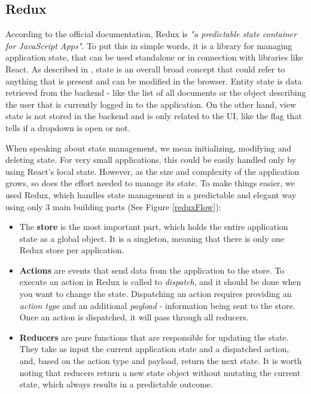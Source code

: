 \subsection{Redux}
\label{section:redux}

According to the official documentation, Redux is \textit{"a predictable state container for JavaScript Apps"}. To put this in simple words, it is a library for managing application state, that can be used standalone or in connection with libraries like React. As described in \cite{tamingTheStateInReact}, state is an overall broad concept that could refer to anything that is present and can be modified in the browser. Entity state is data retrieved from the backend - like the list of all documents or the object describing the user that is currently logged in to the application. On the other hand, view state is not stored in the backend and is only related to the UI, like the flag that tells if a dropdown is open or not.

When speaking about state management, we mean initializing, modifying and deleting state. For very small applications, this could be easily handled only by using React's local state. However, as the size and complexity of the application grows, so does the effort needed to manage its state. To make things easier, we used Redux, which handles state management in a predictable and elegant way using only 3 main building parts (See Figure \ref{reduxFlow}):

\begin{itemize}
  \item The \textbf{store} is the most important part, which holds the entire application state as a global object. It is a singleton, meaning that there is only one Redux store per application.
  \item \textbf{Actions} are events that send data from the application to the store. To execute an action in Redux is called to \textit{dispatch}, and it should be done when you want to change the state. Dispatching an action requires providing an \textit{action type} and an additional \textit{payload} - information being sent to the store. Once an action is dispatched, it will pass through all reducers.
  \item \textbf{Reducers} are pure functions that are responsible for updating the state. They take as input the current application state and a dispatched action, and, based on the action type and payload, return the next state. It is worth noting that reducers return a new state object without mutating the current state, which always results in a predictable outcome.
\end{itemize}

